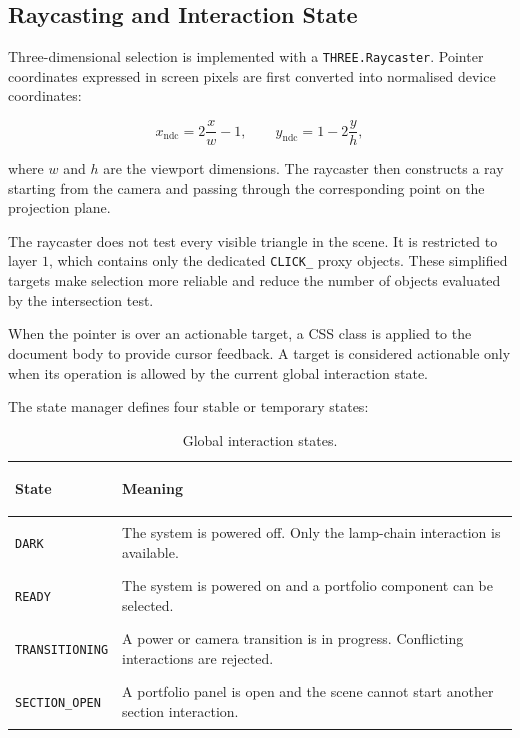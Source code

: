 \documentclass{report}
\begin{document}
\subsection{Raycasting and Interaction State}

Three-dimensional selection is implemented with a
\texttt{THREE.Raycaster}. Pointer coordinates expressed in screen pixels
are first converted into normalised device coordinates:

\[
x_{\mathrm{ndc}} = 2\frac{x}{w}-1,
\qquad
y_{\mathrm{ndc}} = 1-2\frac{y}{h},
\]

where \(w\) and \(h\) are the viewport dimensions. The raycaster then
constructs a ray starting from the camera and passing through the
corresponding point on the projection plane.

The raycaster does not test every visible triangle in the scene. It is
restricted to layer \(1\), which contains only the dedicated
\texttt{CLICK\_} proxy objects. These simplified targets make selection
more reliable and reduce the number of objects evaluated by the
intersection test.

When the pointer is over an actionable target, a CSS class is applied to
the document body to provide cursor feedback. A target is considered
actionable only when its operation is allowed by the current global
interaction state.

The state manager defines four stable or temporary states:

\begin{table}[ht]
    \centering
    \small
    \setlength{\tabcolsep}{7pt}
    \renewcommand{\arraystretch}{1.22}

    \begin{tabularx}{\textwidth}{
        @{}
        >{\bfseries\raggedright\arraybackslash}p{}
        >{\raggedright\arraybackslash}X
        @{}
    }
        \toprule
        State & Meaning \\
        \midrule

        \texttt{DARK}
        &
        The system is powered off. Only the lamp-chain interaction is
        available.
        \\

        \texttt{READY}
        &
        The system is powered on and a portfolio component can be
        selected.
        \\

        \texttt{TRANSITIONING}
        &
        A power or camera transition is in progress. Conflicting
        interactions are rejected.
        \\

        \texttt{SECTION\_OPEN}
        &
        A portfolio panel is open and the scene cannot start another
        section interaction.
        \\

        \bottomrule
    \end{tabularx}

    \caption{Global interaction states.}
    \label{tab:interaction-states}
\end{table}
\end{document}
